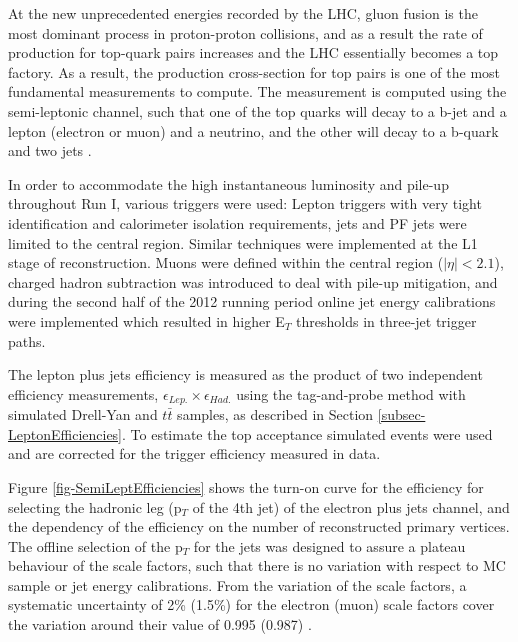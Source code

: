 At the new unprecedented energies recorded by the LHC, gluon fusion is the most dominant process in proton-proton collisions, and as a result the rate of production for top-quark pairs increases and the LHC essentially becomes a top factory. As a result, the production cross-section for top pairs is one of the most fundamental measurements to compute. The measurement is computed using the semi-leptonic channel, such that one of the top quarks will decay to a b-jet and a lepton (electron or muon) and a neutrino, and the other will decay to a b-quark and two jets \cite{Chatrchyan:2012ria, SemiLeptPAS}. 

In order to accommodate the high instantaneous luminosity and pile-up throughout Run I, various triggers were used: Lepton triggers with very tight identification and calorimeter isolation requirements, jets and PF jets were limited to the central region. Similar techniques were implemented at the L1 stage of reconstruction. Muons were defined within the central region ($|\eta| < 2.1$), charged hadron subtraction was introduced to deal with pile-up mitigation, and during the second half of the 2012 running period online jet energy calibrations were implemented which resulted in higher E$_T$ thresholds in three-jet trigger paths. 

The lepton plus jets efficiency is measured as the product of two independent efficiency measurements, $\epsilon_{Lep.} \times \epsilon_{Had.}$ using the tag-and-probe method with simulated Drell-Yan and $t\bar{t}$ samples, as described in Section \ref{subsec-LeptonEfficiencies}. To estimate the top acceptance simulated events were used and are corrected for the trigger efficiency measured in data. 

Figure \ref{fig-SemiLeptEfficiencies} shows the turn-on curve for the efficiency for selecting the hadronic leg (p$_T$ of the 4th jet) of the electron plus jets channel, and the dependency of the efficiency on the number of reconstructed primary vertices. The offline selection of the p$_T$ for the jets was designed to assure a plateau behaviour of the scale factors, such that there is no variation with respect to MC sample or jet energy calibrations. From the variation of the scale factors, a systematic uncertainty of 2\% (1.5\%) for the electron (muon) scale factors cover the variation around their value of 0.995 (0.987) \cite{CMSTriggerPerformance}. 

